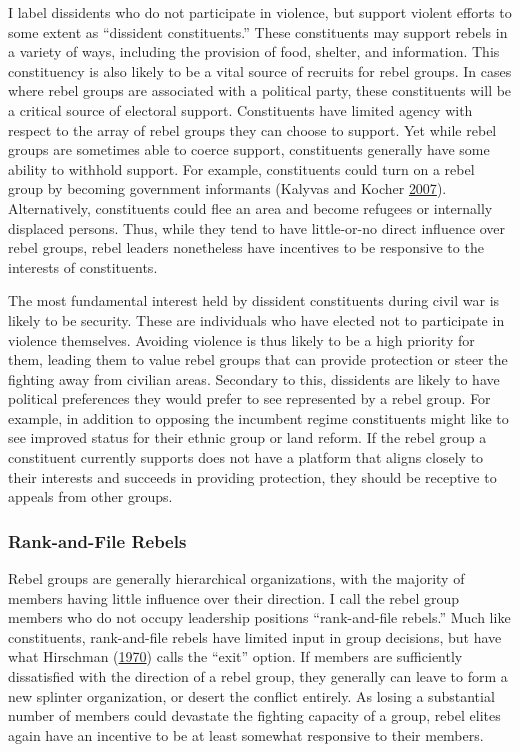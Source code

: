 \documentclass[12pt,]{book}
\theoremstyle{definition}
\theoremstyle{definition}
\theoremstyle{definition}
\theoremstyle{remark}
\begin{document}
I label dissidents who do not participate in violence, but support
violent efforts to some extent as ``dissident constituents.'' These
constituents may support rebels in a variety of ways, including the
provision of food, shelter, and information. This constituency is also
likely to be a vital source of recruits for rebel groups. In cases where
rebel groups are associated with a political party, these constituents
will be a critical source of electoral support. Constituents have
limited agency with respect to the array of rebel groups they can choose
to support. Yet while rebel groups are sometimes able to coerce support,
constituents generally have some ability to withhold support. For
example, constituents could turn on a rebel group by becoming government
informants (Kalyvas and Kocher
\protect\hyperlink{ref-Kalyvas2007}{2007}). Alternatively, constituents
could flee an area and become refugees or internally displaced persons.
Thus, while they tend to have little-or-no direct influence over rebel
groups, rebel leaders nonetheless have incentives to be responsive to
the interests of constituents.

The most fundamental interest held by dissident constituents during
civil war is likely to be security. These are individuals who have
elected not to participate in violence themselves. Avoiding violence is
thus likely to be a high priority for them, leading them to value rebel
groups that can provide protection or steer the fighting away from
civilian areas. Secondary to this, dissidents are likely to have
political preferences they would prefer to see represented by a rebel
group. For example, in addition to opposing the incumbent regime
constituents might like to see improved status for their ethnic group or
land reform. If the rebel group a constituent currently supports does
not have a platform that aligns closely to their interests and succeeds
in providing protection, they should be receptive to appeals from other
groups.

\hypertarget{rank-and-file-rebels}{%
\subsubsection*{Rank-and-File Rebels}\label{rank-and-file-rebels}}

Rebel groups are generally hierarchical organizations, with the majority
of members having little influence over their direction. I call the
rebel group members who do not occupy leadership positions
``rank-and-file rebels.'' Much like constituents, rank-and-file rebels
have limited input in group decisions, but have what Hirschman
(\protect\hyperlink{ref-Hirschman1970}{1970}) calls the ``exit'' option.
If members are sufficiently dissatisfied with the direction of a rebel
group, they generally can leave to form a new splinter organization, or
desert the conflict entirely. As losing a substantial number of members
could devastate the fighting capacity of a group, rebel elites again
have an incentive to be at least somewhat responsive to their members.
\end{document}
